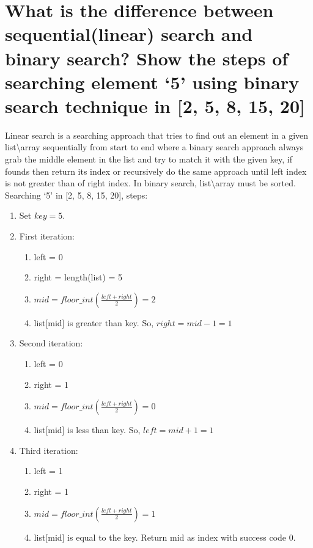 \documentclass[11 pt]{article}
\begin{document}
\section{What is the difference between sequential(linear) search and binary search? Show the steps of searching element \enquote*{5} using binary search technique in [2, 5, 8, 15, 20]}
\justify
{
Linear search is a searching approach that tries to find out an element in a given list\textbackslash array sequentially from start to end where a binary search approach always grab the middle element in the list and try to match it with the given key, if founds then return its index or recursively do the same approach until left index is not greater than of right index. In binary search, list\textbackslash array must be sorted.\\
}
Searching \enquote*{5} in [2, 5, 8, 15, 20], steps:
\begin{enumerate}
	\item Set $key = 5$.
	\item First iteration:
		\begin{enumerate}
			\item left = 0
			\item right = length(list) = 5
			\item $mid = floor\_int\left(\frac{left+right}{2}\right) = 2$
			\item list[mid] is greater than key. So, $right = mid -1 = 1$
		\end{enumerate}
	\item Second iteration:
		\begin{enumerate}
			\item left = 0
			\item right = 1
			\item $mid = floor\_int\left(\frac{left+right}{2}\right) = 0$
			\item list[mid] is less than key. So, $left = mid+1 = 1$
		\end{enumerate}
	\item Third iteration:
		\begin{enumerate}
			\item left = 1
			\item right = 1
			\item $mid = floor\_int\left(\frac{left+right}{2}\right) = 1$
			\item list[mid] is equal to the key. Return mid as index with success code 0.
		\end{enumerate}
\end{enumerate}
\end{document}
